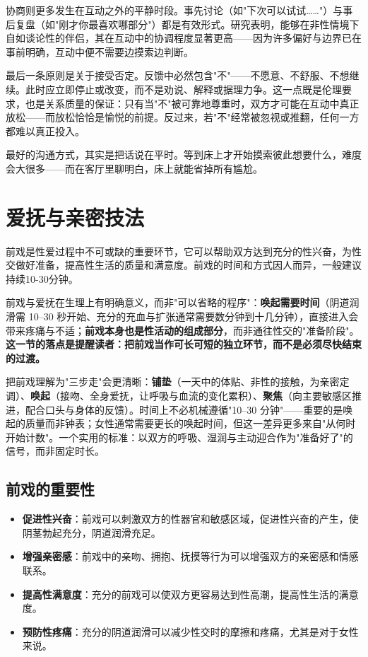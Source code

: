 \documentclass[12pt,UTF8]{ctexbook}
\begin{document}
协商则更多发生在互动之外的平静时段。事先讨论（如"下次可以试试……"）与事后复盘（如"刚才你最喜欢哪部分"）都是有效形式。研究表明，能够在非性情境下自如谈论性的伴侣，其在互动中的协调程度显著更高——因为许多偏好与边界已在事前明确，互动中便不需要边摸索边判断。

最后一条原则是关于接受否定。反馈中必然包含"不"——不愿意、不舒服、不想继续。此时应立即停止或改变，而不是劝说、解释或据理力争。这一点既是伦理要求，也是关系质量的保证：只有当"不"被可靠地尊重时，双方才可能在互动中真正放松——而放松恰恰是愉悦的前提。反过来，若"不"经常被忽视或推翻，任何一方都难以真正投入。

\begin{tcolorbox}[colback=pink!5!white,colframe=red!50!black,title=贴心小叮咛]
最好的沟通方式，其实是把话说在平时。等到床上才开始摸索彼此想要什么，难度会大很多——而在客厅里聊明白，床上就能省掉所有尴尬。
\end{tcolorbox}

\section{爱抚与亲密技法}

前戏是性爱过程中不可或缺的重要环节，它可以帮助双方达到充分的性兴奋，为性交做好准备，提高性生活的质量和满意度。前戏的时间和方式因人而异，一般建议持续10-30分钟。


前戏与爱抚在生理上有明确意义，而非"可以省略的程序"：\textbf{唤起需要时间}（阴道润滑需 10--30 秒开始、充分的充血与扩张通常需要数分钟到十几分钟），直接进入会带来疼痛与不适；\textbf{前戏本身也是性活动的组成部分}，而非通往性交的"准备阶段"。\textbf{这一节的落点是提醒读者：把前戏当作可长可短的独立环节，而不是必须尽快结束的过渡。}

把前戏理解为"三步走"会更清晰：\textbf{铺垫}（一天中的体贴、非性的接触，为亲密定调）、\textbf{唤起}（接吻、全身爱抚，让呼吸与血流的变化累积）、\textbf{聚焦}（向主要敏感区推进，配合口头与身体的反馈）。时间上不必机械遵循"10--30 分钟"——重要的是唤起的质量而非钟表；女性通常需要更长的唤起时间，但这一差异更多来自"从何时开始计数"。一个实用的标准：以双方的呼吸、湿润与主动迎合作为"准备好了"的信号，而非固定时长。


\subsection{前戏的重要性}

\begin{itemize}
\item \textbf{促进性兴奋}：前戏可以刺激双方的性器官和敏感区域，促进性兴奋的产生，使阴茎勃起充分，阴道润滑充足。
\item \textbf{增强亲密感}：前戏中的亲吻、拥抱、抚摸等行为可以增强双方的亲密感和情感联系。
\item \textbf{提高性满意度}：充分的前戏可以使双方更容易达到性高潮，提高性生活的满意度。
\item \textbf{预防性疼痛}：充分的阴道润滑可以减少性交时的摩擦和疼痛，尤其是对于女性来说。
\end{itemize}
\end{document}
